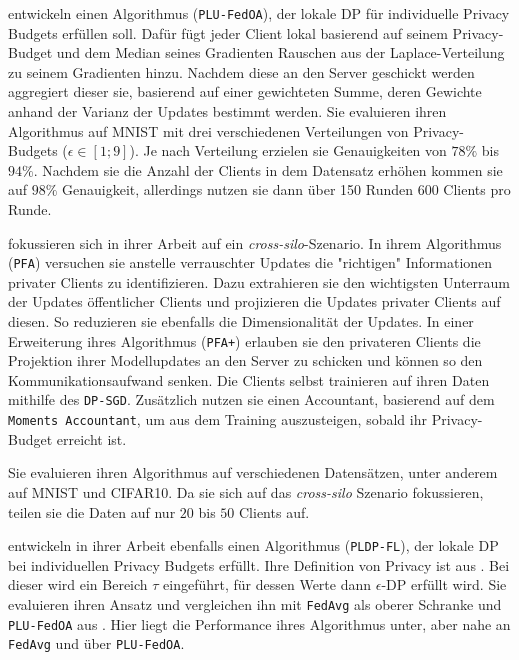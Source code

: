 \textcite{yang:2021} entwickeln einen Algorithmus (\texttt{PLU-FedOA}), der lokale DP für individuelle Privacy Budgets erfüllen soll. Dafür fügt jeder Client lokal basierend auf seinem Privacy-Budget und dem Median seines Gradienten Rauschen aus der Laplace-Verteilung zu seinem Gradienten hinzu. Nachdem diese an den Server geschickt werden aggregiert dieser sie, basierend auf einer gewichteten Summe, deren Gewichte anhand der Varianz der Updates bestimmt werden. Sie evaluieren ihren Algorithmus auf MNIST mit drei verschiedenen Verteilungen von Privacy-Budgets ($\epsilon \in [1;9]$). Je nach Verteilung erzielen sie Genauigkeiten von $78\%$ bis $94\%$. Nachdem sie die Anzahl der Clients in dem Datensatz erhöhen kommen sie auf $98\%$ Genauigkeit, allerdings nutzen sie dann über 150 Runden 600 Clients pro Runde.

\textcite{liu:2021} fokussieren sich in ihrer Arbeit auf ein \textit{cross-silo}-Szenario. In ihrem Algorithmus (\texttt{PFA}) versuchen sie anstelle verrauschter Updates die "richtigen" Informationen privater Clients zu identifizieren. Dazu extrahieren sie den wichtigsten Unterraum der Updates öffentlicher Clients und projizieren die Updates privater Clients auf diesen. So reduzieren sie ebenfalls die Dimensionalität der Updates. In einer Erweiterung ihres Algorithmus (\texttt{PFA+}) erlauben sie den privateren Clients die Projektion ihrer Modellupdates an den Server zu schicken und können so den Kommunikationsaufwand senken. Die Clients selbst trainieren auf ihren Daten mithilfe des \texttt{DP-SGD}\cite{abadi:2016}. Zusätzlich nutzen sie einen Accountant, basierend auf dem \texttt{Moments Accountant}, um aus dem Training auszusteigen, sobald ihr Privacy-Budget erreicht ist.

Sie evaluieren ihren Algorithmus auf verschiedenen Datensätzen, unter anderem auf MNIST und CIFAR10. Da sie sich auf das \textit{cross-silo} Szenario fokussieren, teilen sie die Daten auf nur $20$ bis $50$ Clients auf.

\textcite{shen:2023} entwickeln in ihrer Arbeit ebenfalls einen Algorithmus (\texttt{PLDP-FL}), der lokale DP bei individuellen Privacy Budgets erfüllt. Ihre Definition von Privacy ist aus \textcite{chen:2016}. Bei dieser wird ein Bereich $\tau$ eingeführt, für dessen Werte dann $\epsilon$-DP erfüllt wird. Sie evaluieren ihren Ansatz und vergleichen ihn mit \texttt{FedAvg} \parencite{mcmahan:2016} als oberer Schranke und \texttt{PLU-FedOA} aus \textcite{yang:2021}. Hier liegt die Performance ihres Algorithmus unter, aber nahe an \texttt{FedAvg} und über \texttt{PLU-FedOA}. 


